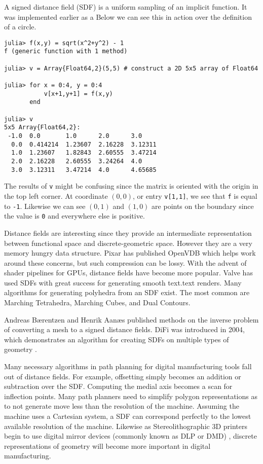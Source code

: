 A signed distance field (SDF) is a uniform sampling of an implicit function.
It was implemented earlier as a 
Below
we can see this in action over the definition of a circle.

\begin{lstlisting}
julia> f(x,y) = sqrt(x^2+y^2) - 1
f (generic function with 1 method)

julia> v = Array{Float64,2}(5,5) # construct a 2D 5x5 array of Float64

julia> for x = 0:4, y = 0:4
           v[x+1,y+1] = f(x,y)
       end

julia> v
5x5 Array{Float64,2}:
 -1.0  0.0       1.0      2.0      3.0    
  0.0  0.414214  1.23607  2.16228  3.12311
  1.0  1.23607   1.82843  2.60555  3.47214
  2.0  2.16228   2.60555  3.24264  4.0    
  3.0  3.12311   3.47214  4.0      4.65685
\end{lstlisting}

The results of \texttt{v} might be confusing since the matrix is oriented with
the origin in the top left corner. At coordinate $(0,0)$, or entry \texttt{v[1,1]},
we see that \texttt{f} is
equal to \texttt{-1}. Likewise we can see $(0,1)$ and $(1,0)$ are points on
the boundary since the value is \texttt{0} and everywhere else is positive.

Distance fields are interesting since they provide an intermediate representation
between functional space and discrete-geometric space. However they are
a very memory hungry data structure. Pixar has published OpenVDB which helps
work around these concerns, but such compression can be lossy.\cite{OpenVDB}
With the advent of shader pipelines for GPUs, distance fields have become
more popular. Valve has used SDFs with great success for generating smooth
text.text renders. \cite{Green_2007}
Many algorithms for generating polyhedra from an SDF
exist. The most common are Marching Tetrahedra, Marching Cubes,
and Dual Contours.\cite{Muller_Wehle_1997}\cite{Newman_Yi_2006}\cite{Cook_Hourvitz}


Andreas Bærentzen and Henrik Aanæs published methods on the inverse
problem of converting a mesh to a signed distance fields.\cite{Baerentzen_Aanaes}
DiFi was introduced in 2004, which demonstrates an algorithm for creating
SDFs on multiple types of geometry \cite{Sud_Otaduy_Manocha_2004}.

Many necessary algorithms in path planning for digital manufacturing tools
fall out of distance fields. For example, offsetting simply becomes
an addition or subtraction over the SDF. Computing the medial axis becomes
a scan for inflection points. Many path planners need to simplify polygon
representations as to not generate move less than the resolution of the machine.
Assuming the machine uses a Cartesian system, a SDF can correspond perfectly
to the lowest available resolution of the machine.
Likewise as Stereolithographic 3D printers
begin to use digital mirror devices (commonly known as DLP or DMD)
, discrete representations of geometry will become more important in
digital manufacturing.

